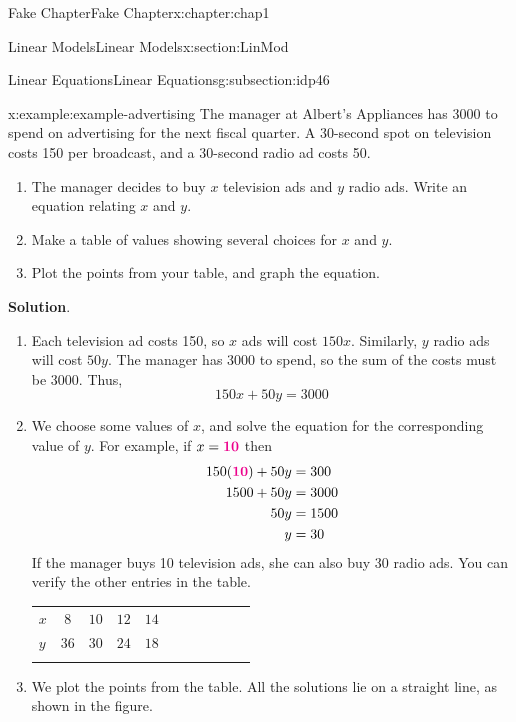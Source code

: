 \documentclass[oneside,10pt,]{book}
\newcommand{\blocktitlefont}{\relax}
\newcommand{\tabularfont}{\relax}
\numberwithin{equation}{section}
\newcommand{\hrulethin}  {\noalign{\hrule height 0.04em}}
\newcommand{\hrulethick} {\noalign{\hrule height 0.11em}}
\newcommand{\alert}[1]{\boldsymbol{\color{magenta}{#1}}}
\newcommand{\amp}{&}
\begin{document}
\begin{chapterptx}{Fake Chapter}{}{Fake Chapter}{}{}{x:chapter:chap1}
\begin{sectionptx}{Linear Models}{}{Linear Models}{}{}{x:section:LinMod}
\begin{subsectionptx}{Linear Equations}{}{Linear Equations}{}{}{g:subsection:idp46}
\begin{example}{}{x:example:example-advertising}
The manager at Albert's Appliances has \textdollar{}3000 to spend on advertising for the next fiscal quarter.  A 30-second spot on television costs \textdollar{}150 per broadcast, and a 30-second radio ad costs \textdollar{}50.%
\par
%
\begin{enumerate}[label=\alph*]
\item{}The manager decides to buy \(x\) television ads and \(y\) radio ads.  Write an equation relating \(x\) and \(y\).%
\item{}Make a table of values showing several choices for \(x\) and \(y\).%
\item{}Plot the points from your table, and graph the equation.%
\end{enumerate}
%
\par\smallskip%
\noindent\textbf{\blocktitlefont Solution}.\hypertarget{g:solution:idp48}{}\quad{}%
\begin{enumerate}[label=\alph*]
\item{}Each television ad costs \textdollar{}150, so \(x\) ads will cost \textdollar{}\(150x\).  Similarly, \(y\) radio ads will cost \textdollar{}\(50y\).  The manager has \textdollar{}3000 to spend, so the sum of the costs must be \textdollar{}3000.  Thus,%
\begin{equation*}
150x+50y=3000
\end{equation*}
%
\item{}We choose some values of \(x\), and solve the equation for the corresponding value of \(y\).  For example, if \(x=\alert{10}\) then%
\begin{align*}
150(\alert{10})+50y\amp=300\\
1500+50y\amp=3000\\
50y\amp=1500\\
y\amp=30
\end{align*}
If the manager buys 10 television ads, she can also buy 30 radio ads.  You can verify the other entries in the table.%
\begin{center}%
{\tabularfont%
\begin{tabular}{AcAcAcAcAcA}\hrulethick
\(x\)&\(8\)&\(10\)&\(12\)&\(14\)\tabularnewline\hrulethin
\(y\)&\(36\)&\(30\)&\(24\)&\(18\)\tabularnewline\hrulethin
\end{tabular}
}%
\end{center}%
\item{}\begin{sidebyside}{2}{0}{0.02}{0.18}%
\begin{sbspanel}{0.5}%
We plot the points from the table. All the solutions lie on a straight line, as shown in the figure.%

\end{sbspanel}
\end{sidebyside}
\end{enumerate}
\end{example}
\end{subsectionptx}
\end{sectionptx}
\end{chapterptx}
\end{document}
